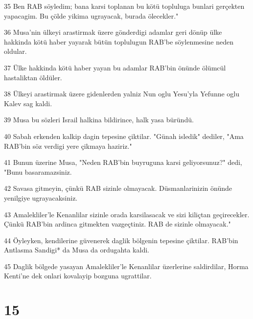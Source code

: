 \par 35 Ben RAB söyledim; bana karsi toplanan bu kötü topluluga bunlari gerçekten yapacagim. Bu çölde yikima ugrayacak, burada ölecekler."
\par 36 Musa'nin ülkeyi arastirmak üzere gönderdigi adamlar geri dönüp ülke hakkinda kötü haber yayarak bütün toplulugun RAB'be söylenmesine neden oldular.
\par 37 Ülke hakkinda kötü haber yayan bu adamlar RAB'bin önünde ölümcül hastaliktan öldüler.
\par 38 Ülkeyi arastirmak üzere gidenlerden yalniz Nun oglu Yesu'yla Yefunne oglu Kalev sag kaldi.
\par 39 Musa bu sözleri Israil halkina bildirince, halk yasa büründü.
\par 40 Sabah erkenden kalkip dagin tepesine çiktilar. "Günah isledik" dediler, "Ama RAB'bin söz verdigi yere çikmaya haziriz."
\par 41 Bunun üzerine Musa, "Neden RAB'bin buyruguna karsi geliyorsunuz?" dedi, "Bunu basaramazsiniz.
\par 42 Savasa gitmeyin, çünkü RAB sizinle olmayacak. Düsmanlarinizin önünde yenilgiye ugrayacaksiniz.
\par 43 Amalekliler'le Kenanlilar sizinle orada karsilasacak ve sizi kiliçtan geçirecekler. Çünkü RAB'bin ardinca gitmekten vazgeçtiniz. RAB de sizinle olmayacak."
\par 44 Öyleyken, kendilerine güvenerek daglik bölgenin tepesine çiktilar. RAB'bin Antlasma Sandigi* da Musa da ordugahta kaldi.
\par 45 Daglik bölgede yasayan Amalekliler'le Kenanlilar üzerlerine saldirdilar, Horma Kenti'ne dek onlari kovalayip bozguna ugrattilar.

\chapter{15}

